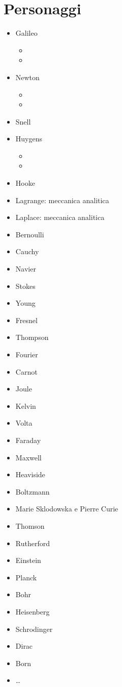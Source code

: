 
\section{Personaggi}
\begin{itemize}
  \item Galileo
  \begin{itemize}
    \item
    \item
  \end{itemize}
  \item Newton
  \begin{itemize}
    \item
    \item
  \end{itemize}
  \item Snell
  \item Huygens
  \begin{itemize}
    \item
    \item
  \end{itemize}
  \item Hooke
  \item Lagrange: meccanica analitica
  \item Laplace: meccanica analitica
  \item Bernoulli
  \item Cauchy
  \item Navier
  \item Stokes
  \item Young
  \item Fresnel
  \item Thompson
  \item Fourier
  \item Carnot
  \item Joule
  \item Kelvin
  \item Volta
  \item Faraday
  \item Maxwell
  \item Heaviside
  \item Boltzmann
  \item Marie Sklodowska e Pierre Curie
  \item Thomson
  \item Rutherford
  \item Einstein
  \item Planck
  \item Bohr
  \item Heisenberg
  \item Schrodinger
  \item Dirac
  \item Born
  \item \dots
\end{itemize}

